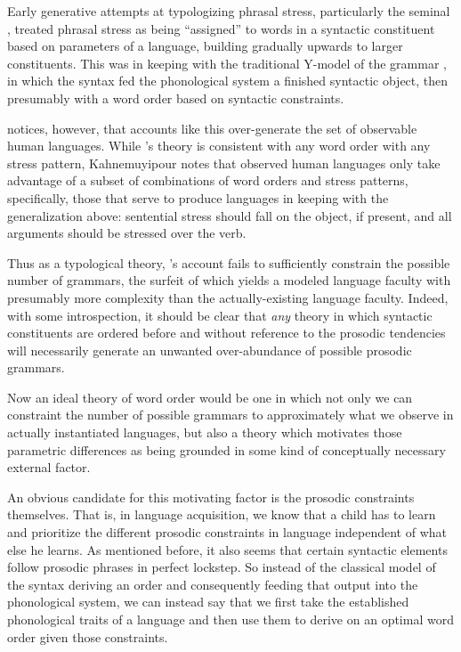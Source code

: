 \documentclass{article}
\begin{document}
Early generative attempts at typologizing phrasal stress, particularly the seminal \textcite{halle87}, treated phrasal stress as being ``assigned'' to words in a syntactic constituent based on parameters of a language, building gradually upwards to larger constituents.
This was in keeping with the traditional Y-model of the grammar \parencite{chomsky65}, in which the syntax fed the phonological system a finished syntactic object, then presumably with a word order based on syntactic constraints.

\textcite{kahnemuyipour05} notices, however, that accounts like this over-generate the set of observable human languages.
While \textcite{halle87}'s theory is consistent with any word order with any stress pattern, Kahnemuyipour notes that observed human languages only take advantage of a subset of combinations of word orders and stress patterns, specifically, those that serve to produce languages in keeping with the generalization above: sentential stress should fall on the object, if present, and all arguments should be stressed over the verb.

Thus as a typological theory, \textcite{halle87}'s account fails to sufficiently constrain the possible number of grammars, the surfeit of which yields a modeled language faculty with presumably more complexity than the actually-existing language faculty.
Indeed, with some introspection, it should be clear that \emph{any} theory in which syntactic constituents are ordered before and without reference to the prosodic tendencies will necessarily generate an unwanted over-abundance of possible prosodic grammars.

Now an ideal theory of word order would be one in which not only we can constraint the number of possible grammars to approximately what we observe in actually instantiated languages, but also a theory which motivates those parametric differences as being grounded in some kind of conceptually necessary external factor.

An obvious candidate for this motivating factor is the prosodic constraints themselves.
That is, in language acquisition, we know that a child has to learn and prioritize the different prosodic constraints in language independent of what else he learns.
As mentioned before, it also seems that certain syntactic elements follow prosodic phrases in perfect lockstep.
So instead of the classical model of the syntax deriving an order and consequently feeding that output into the phonological system, we can instead say that we first take the established phonological traits of a language and then use them to derive on an optimal word order given those constraints.
\end{document}
